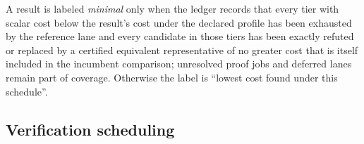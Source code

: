 \begin{decision}
A result is labeled \emph{minimal} only when the ledger records that every tier with scalar cost below the result's cost under the declared profile has been exhausted by the reference lane and every candidate in those tiers has been exactly refuted or replaced by a certified equivalent representative of no greater cost that is itself included in the incumbent comparison; unresolved proof jobs and deferred lanes remain part of coverage. Otherwise the label is ``lowest cost found under this schedule''.
\end{decision}

\subsection{Verification scheduling}\label{alg:verification}

